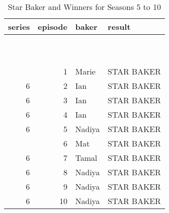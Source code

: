 \documentclass[
]{article}
\begin{document}
\begin{longtable}[t]{rrll}
\caption{\label{tab:unnamed-chunk-19}Star Baker and Winners for Seasons 5 to 10}\\
\toprule
series & episode & baker & result\\
\midrule
\cellcolor{lightgray}{5} & \cellcolor{lightgray}{1} & \cellcolor{lightgray}{Nancy} & \cellcolor{lightgray}{STAR BAKER}\\
\cellcolor{lightgray}{5} & \cellcolor{lightgray}{2} & \cellcolor{lightgray}{Richard} & \cellcolor{lightgray}{STAR BAKER}\\
\cellcolor{lightgray}{5} & \cellcolor{lightgray}{3} & \cellcolor{lightgray}{Luis} & \cellcolor{lightgray}{STAR BAKER}\\
\cellcolor{lightgray}{5} & \cellcolor{lightgray}{4} & \cellcolor{lightgray}{Richard} & \cellcolor{lightgray}{STAR BAKER}\\
\cellcolor{lightgray}{5} & \cellcolor{lightgray}{5} & \cellcolor{lightgray}{Kate} & \cellcolor{lightgray}{STAR BAKER}\\
\addlinespace
\cellcolor{lightgray}{5} & \cellcolor{lightgray}{6} & \cellcolor{lightgray}{Chetna} & \cellcolor{lightgray}{STAR BAKER}\\
\cellcolor{lightgray}{5} & \cellcolor{lightgray}{7} & \cellcolor{lightgray}{Richard} & \cellcolor{lightgray}{STAR BAKER}\\
\cellcolor{lightgray}{5} & \cellcolor{lightgray}{8} & \cellcolor{lightgray}{Richard} & \cellcolor{lightgray}{STAR BAKER}\\
\cellcolor{lightgray}{5} & \cellcolor{lightgray}{9} & \cellcolor{lightgray}{Richard} & \cellcolor{lightgray}{STAR BAKER}\\
\cellcolor{lightgray}{5} & \cellcolor{lightgray}{10} & \cellcolor{lightgray}{Nancy} & \cellcolor{lightgray}{STAR BAKER}\\
\addlinespace
6 & 1 & Marie & STAR BAKER\\
6 & 2 & Ian & STAR BAKER\\
6 & 3 & Ian & STAR BAKER\\
6 & 4 & Ian & STAR BAKER\\
6 & 5 & Nadiya & STAR BAKER\\
\addlinespace
6 & 6 & Mat & STAR BAKER\\
6 & 7 & Tamal & STAR BAKER\\
6 & 8 & Nadiya & STAR BAKER\\
6 & 9 & Nadiya & STAR BAKER\\
6 & 10 & Nadiya & STAR BAKER\\

\end{longtable}
\end{document}
